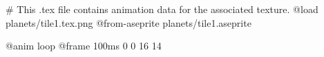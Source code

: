# This .tex file contains animation data for the associated texture.
@load planets/tile1.tex.png
@from-aseprite planets/tile1.aseprite

@anim loop
	@frame 100ms 0 0 16 14
